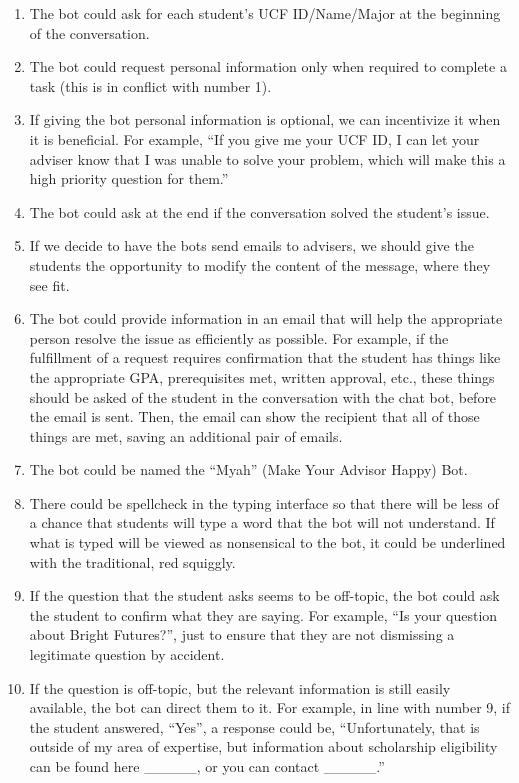 \documentclass[titlepage, 12pt]{article}
\begin{document}
\begin{enumerate}
    \item The bot could ask for each student’s UCF ID/Name/Major at the beginning of the conversation. 
    \item The bot could request personal information only when required to complete a task (this is in conflict with number 1). 
    \item If giving the bot personal information is optional, we can incentivize it when it is beneficial. For example, “If you give me your UCF ID, I can let your adviser know that I was unable to solve your problem, which will make this a high priority question for them.” 
    \item The bot could ask at the end if the conversation solved the student’s issue. 
    \item If we decide to have the bots send emails to advisers, we should give the students the opportunity to modify the content of the message, where they see fit. 
    \item The bot could provide information in an email that will help the appropriate person resolve the issue as efficiently as possible. For example, if the fulfillment of a request requires confirmation that the student has things like the appropriate GPA, prerequisites met, written approval, etc., these things should be asked of the student in the conversation with the chat bot, before the email is sent. Then, the email can show the recipient that all of those things are met, saving an additional pair of emails. 
    \item The bot could be named the “Myah” (Make Your Advisor Happy) Bot.  
    \item There could be spellcheck in the typing interface so that there will be less of a chance that students will type a word that the bot will not understand. If what is typed will be viewed as nonsensical to the bot, it could be underlined with the traditional, red squiggly. 
    \item If the question that the student asks seems to be off-topic, the bot could ask the student to confirm what they are saying. For example, “Is your question about Bright Futures?”, just to ensure that they are not dismissing a legitimate question by accident. 
    \item If the question is off-topic, but the relevant information is still easily available, the bot can direct them to it. For example, in line with number 9, if the student answered, “Yes”, a response could be, “Unfortunately, that is outside of my area of expertise, but information about scholarship eligibility can be found here \_\_\_\_\_, or you can contact \_\_\_\_\_.” 

\end{enumerate}
\end{document}
